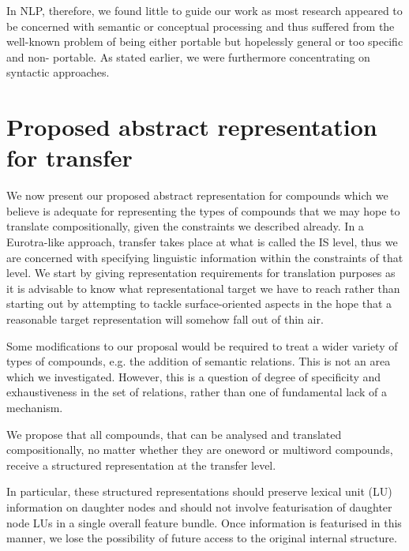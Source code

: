 In  NLP,  therefore,  we  found little to guide our work as  most 
research  appeared  to be concerned with semantic  or  conceptual 
processing and thus suffered from the well-known problem of being 
either  portable but hopelessly general or too specific and  non-
portable. As stated earlier, we were furthermore concentrating on 
syntactic approaches.

\section{Proposed abstract representation for transfer}

We now present our proposed abstract representation for compounds 
which  we   believe  is adequate for representing the  types   of  
compounds  that  we  may  hope  to   translate   compositionally,   
given   the constraints  we described already.  In a Eurotra-like 
approach,  transfer  takes place at what is called the IS  level, 
thus  we  are concerned with  specifying  linguistic  information 
within  the  constraints  of  that  level.  We  start  by  giving 
representation  requirements  for translation purposes as  it  is 
advisable  to know what representational target we have to  reach 
rather than starting out by attempting to tackle surface-oriented 
aspects in the hope that a reasonable target representation  will 
somehow fall out of thin air.

Some  modifications to our proposal would be  required  to  treat 
a wider variety of types of compounds,   e.g.  the  addition   of 
semantic   relations.  This is not an area which we investigated. 
However,  this  is  a  question  of  degree  of  specificity  and 
exhaustiveness  in  the  set of relations,   rather than  one  of 
fundamental lack of  a mechanism. 

We  propose  that  all compounds,   that  can  be   analysed  and 
translated compositionally,  no matter whether they are   oneword  
or  multiword  compounds,   receive  a  structured representation 
at the transfer level.

In  particular,  these structured representations should preserve 
lexical  unit  (LU)  information    on    daughter    nodes   and   
should   not   involve featurisation of daughter node LUs in a
single overall feature bundle.  Once information is featurised in 
this  manner,  we  lose the possibility of future access  to  the 
original internal structure.

